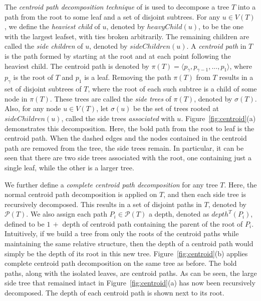 \documentclass[12pt,a4paper]{article}
\begin{document}
    The \textit{centroid path decomposition technique} of \cite{cole2000n} is used to decompose a tree $T$ into a path from the root to some leaf and a set of disjoint subtrees. For any $u \in V(T)$, we define the \textit{heaviest child} of $u$, denoted by $heavyChild(u)$, to be the one with the largest leafset, with ties broken arbitrarily. The remaining children are called the \textit{side children} of $u$, denoted by $sideChildren(u)$. A \textit{centroid path} in $T$ is the path formed by starting at the root and at each point following the heaviest child. The centroid path is denoted by $\pi(T) = \langle p_{\gamma}, p_{\gamma - 1}, ..., p_1 \rangle$, where $p_{\gamma}$ is the root of $T$ and $p_1$ is a leaf. Removing the path $\pi(T)$ from $T$ results in a set of disjoint subtrees of $T$, where the root of each such subtree is a child of some node in $\pi(T)$. These trees are called the \textit{side trees} of $\pi(T)$, denoted by $\sigma(T)$. Also, for any node $u \in V(T)$, let $\sigma(u)$ be the set of trees rooted at $sideChildren(u)$, called the side trees \textit{associated} with $u$. Figure~\ref{fig:centroid}(a) demonstrates this decomposition. Here, the bold path from the root to leaf is the centroid path. When the dashed edges and the nodes contained in the centroid path are removed from the tree, the side trees remain. In particular, it can be seen that there are two side trees associated with the root, one containing just a single leaf, while the other is a larger tree.

    We further define a \textit{complete centroid path decomposition} for any tree $T$. Here, the normal centroid path decomposition is applied on $T$, and then each side tree is recursively decomposed. This results in a set of disjoint paths in $T$, denoted by $\mathcal{P}(T)$. We also assign each path $P_i \in \mathcal{P}(T)$ a depth, denoted as $depth^{T}(P_i)$, defined to be $1\, +$ depth of centroid path containing the parent of the root of $P_i$. Intuitively, if we build a tree from only the roots of the centroid paths while maintaining the same relative structure, then the depth of a centroid path would simply be the depth of its root in this new tree. Figure~\ref{fig:centroid}(b) applies complete centroid path decomposition on the same tree as before. The bold paths, along with the isolated leaves, are centroid paths. As can be seen, the large side tree that remained intact in Figure~\ref{fig:centroid}(a) has now been recursively decomposed. The depth of each centroid path is shown next to its root.
\end{document}
